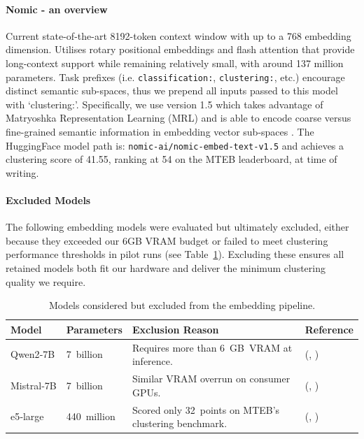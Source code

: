 \documentclass[10pt,oneside]{report}
\renewcommand{\citet}[1]{\citeauthor{#1}, \citeyear{#1}}
\begin{document}
\paragraph{Nomic - an overview}
Current state-of-the-art 8192-token context window with up to a 768 embedding dimension. Utilises rotary positional embeddings and flash attention that provide long-context support while remaining relatively small, with around 137 million parameters. Task prefixes (i.e. \texttt{classification:}, \texttt{clustering:}, etc.) encourage distinct semantic sub-spaces, thus we prepend all inputs passed to this model with `clustering:'. Specifically, we use version 1.5 which takes advantage of Matryoshka Representation Learning (MRL) and is able to encode coarse versus fine-grained semantic information in embedding vector sub-spaces \cite{nussbaum2024nomic, nussbaum2024nomic1.5}. The HuggingFace model path is: \texttt{nomic-ai/nomic-embed-text-v1.5} and achieves a clustering score of 41.55, ranking at 54 on the MTEB leaderboard, at time of writing.

\paragraph{Excluded Models}
The following embedding models were evaluated but ultimately excluded, either because they exceeded our 6GB VRAM budget or failed to meet clustering performance thresholds in pilot runs (see Table~\ref{tab:excludedModels}). Excluding these ensures all retained models both fit our hardware and deliver the minimum clustering quality we require.

\begin{table}[htbp]
    \fontsize{8}{11}\selectfont
    \centering
    \begin{adjustbox}{max width=\textwidth}
        \begin{tabular}{p{1.6cm} p{1.7cm} p{7.3cm} p{2.5cm}}
        \toprule
        \textbf{Model} & \textbf{Parameters} & \textbf{Exclusion Reason} & \textbf{Reference}\\
        \midrule
        Qwen2‑7B   & 7 billion   & Requires more than 6 GB VRAM at inference. & (\citet{yang2407qwen2}) \\
        Mistral‑7B & 7 billion   & Similar VRAM overrun on consumer GPUs. & (\citet{wang2023improving}) \\
        e5‑large   & 440 million & Scored only 32 points on MTEB’s clustering  benchmark. & (\citet{wang2024multilingual})\\
        \bottomrule
        \end{tabular}
    \end{adjustbox}
    \caption{Models considered but excluded from the embedding pipeline.}
    \label{tab:excludedModels}
\end{table}
\end{document}
